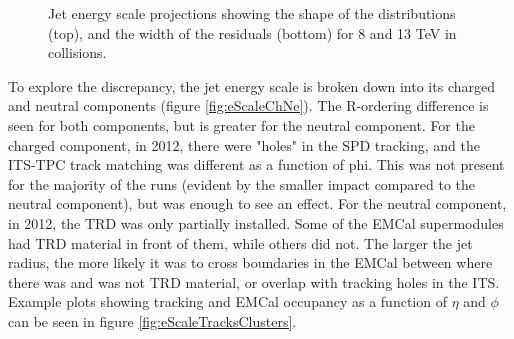 \begin{figure}[h!]
    \centering
    \caption{Jet energy scale projections showing the shape of the distributions (top), and the width of the residuals (bottom) for 8 and 13 TeV in \pp collisions.}
    \label{fig:eScaleShapeWidth}
\end{figure}

To explore the discrepancy, the jet energy scale is broken down into its charged and neutral components (figure \ref{fig:eScaleChNe}). The R-ordering difference is seen for both components, but is greater for the neutral component. For the charged component, in 2012, there were "holes" in the SPD tracking, and the ITS-TPC track matching was different as a function of phi. This was not present for the majority of the runs (evident by the smaller impact compared to the neutral component), but was enough to see an effect. For the neutral component, in 2012, the TRD was only partially installed. Some of the EMCal supermodules had TRD material in front of them, while others did not. The larger the jet radius, the more likely it was to cross boundaries in the EMCal between where there was and was not TRD material, or overlap with tracking holes in the ITS. Example plots showing tracking and EMCal occupancy as a function of $\eta$ and $\phi$ can be seen in figure \ref{fig:eScaleTracksClusters}.

